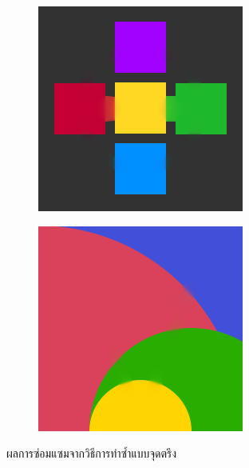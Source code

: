 \begin{figure}[H]
\begin{subfigure}{\ResultSubFigureWidth \linewidth}
	\end{subfigure}
	\begin{subfigure}{\ResultSubFigureWidth \linewidth}
		\centering
		\includegraphics[width=\ResultSubFigurePadding \linewidth]{image/result_ex1/fixpoint04.png}			
	\end{subfigure}
	\begin{subfigure}{\ResultSubFigureWidth \linewidth}
		\centering
		\includegraphics[width=\ResultSubFigurePadding \linewidth]{image/result_ex1/fixpoint05.png}			
	\end{subfigure}
	\caption{ผลการซ่อมแซมจากวิธีการทำซ้ำแบบจุดตรึง}
\end{figure}